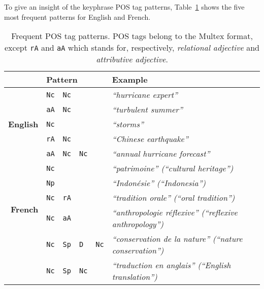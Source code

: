     To give an insight of the keyphrase POS tag patterns,
    Table~\ref{tab:best_patterns} shows the five most frequent patterns for
    English and French.
    \begin{table}[h]
      \centering
      \begin{tabular}{r|lllll}
        \toprule
        \multicolumn{1}{r}{} & \multicolumn{4}{l}{\textbf{Pattern}} & \textbf{Example}\\
        \midrule
        \multirow{5}{*}[-2pt]{\begin{sideways}\textbf{English}\end{sideways}} & \verb:Nc: & \verb:Nc: & & & \textit{``hurricane expert''}\\ %
        & \verb:aA: & \verb:Nc: & & & \textit{``turbulent summer''}\\ %
        & \verb:Nc: & & & & \textit{``storms''}\\ %
        & \verb:rA: & \verb:Nc: & & & \textit{``Chinese earthquake''}\\ %
        & \verb:aA: & \verb:Nc: & \verb:Nc: & & \textit{``annual hurricane forecast''}\\ %
        \hline%
        \multirow{5}{*}[-2pt]{\begin{sideways}\textbf{French}\end{sideways}} & \verb:Nc: & & & & \textit{``patrimoine'' (``cultural heritage'')}\\ %
        & \verb:Np: & & & & \textit{``Indonésie'' (``Indonesia'')}\\ %
        & \verb:Nc: & \verb:rA: & & & \textit{``tradition orale'' (``oral tradition'')}\\ %
        & \verb:Nc: & \verb:aA: & & & \textit{``anthropologie réflexive'' (``reflexive anthropology'')}\\ %
        & \verb:Nc: & \verb:Sp: & \verb:D: & \verb:Nc: & \textit{``conservation de la nature'' (``nature conservation'')}\\ %
        & \verb:Nc: & \verb:Sp: & \verb:Nc: & & \textit{``traduction en anglais'' (``English translation'')}\\ %
        \bottomrule
      \end{tabular}
      \caption{Frequent POS tag patterns. POS tags belong to the Multex format,
               except \texttt{rA} and \texttt{aA} which stands for,
               respectively, \textit{relational adjective} and
               \textit{attributive adjective}.
               \label{tab:best_patterns}}
    \end{table}

